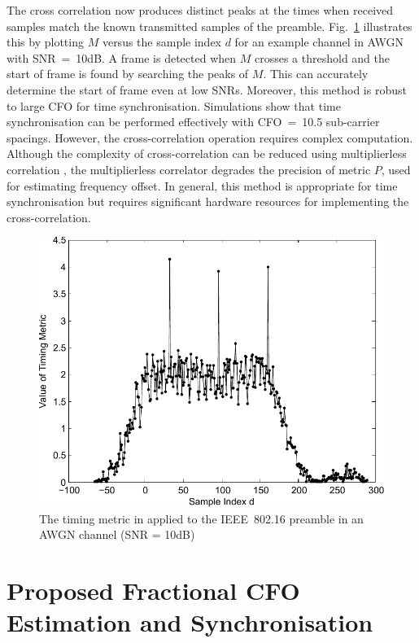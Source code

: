 The cross correlation now produces distinct peaks at the times when received samples match the known transmitted samples of the preamble. Fig.~\ref{fig:M2-10dB} illustrates this by plotting $M$ versus the sample index $d$ for an example channel in AWGN with SNR~=~10{\thinspace}dB. 
A frame is detected when $M$ crosses a threshold and the start of frame is found by searching the peaks of $M$. 
This can accurately determine the start of frame even at low SNRs. 
Moreover, this method is robust to large CFO for time synchronisation. 
Simulations \cite{Kishore2006} show that time synchronisation can be performed effectively with CFO~=~10.5 sub-carrier spacings.
However, the cross-correlation operation requires complex computation. 
Although the complexity of cross-correlation can be reduced using multiplierless correlation \cite{Yip2003}, the multiplierless correlator degrades the precision of metric $P$, used for estimating frequency offset.
In general, this method is appropriate for time synchronisation but requires significant hardware resources for implementing the cross-correlation.

\begin{figure}
	\centerline{\includegraphics [width=0.8\columnwidth] {figures/M2_10dB.pdf} }
	\caption{The timing metric in \cite{Kishore2006} applied to the IEEE~802.16 preamble in an AWGN channel (SNR = 10dB)}
	\label{fig:M2-10dB}
\end{figure}

\section{Proposed Fractional CFO Estimation and Synchronisation}

